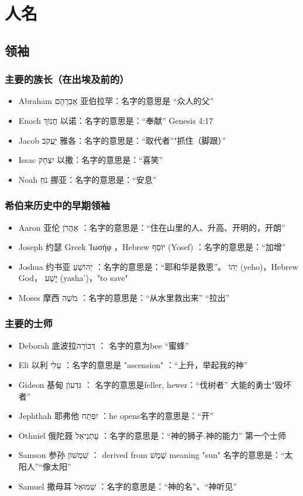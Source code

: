 \section{人名}
\subsection{领袖}
\subsubsection{主要的族长（在出埃及前的）}
\begin{itemize}
\itemsep-.45em  
\item Abraham אַבְרָהָם 亚伯拉罕：名字的意思是 “众人的父”
\item Enoch חֲנוֹךְ 以诺：名字的意思是：“奉献” Genesis 4:17
\item Jacob יַעֲקֹב 雅各：名字的意思是：“取代者”"抓住（脚跟）”
\item Issac יִצְחָק‎ 以撒：名字的意思是：“喜笑”
\item Noah נֹחַ 挪亚：名字的意思是：“安息”
\end{itemize}

\subsubsection{希伯来历史中的早期领袖}
\begin{itemize}
\itemsep-.45em
\item Aaron  亚伦 אַהֲרֹן ：名字的意思是：“住在山里的人、升高、开明的，开朗”
\item Joseph  约瑟 Greek Ἰωσήφ ，Hebrew  יוֹסֵף (Yosef) ：名字的意思是：“加增”
\item Joshua  约书亚 יְהוֹשֻׁעַ ：名字的意思是：“耶和华是救恩”。  יְהוֹ (yeho)，Hebrew God， יָשַׁע (yasha')，"to save"
\item Moses  摩西 מֹשֶׁה ：名字的意思是：“从水里救出来” “拉出”
\end{itemize}

\subsubsection{主要的士师}
\begin{itemize}
\itemsep-.45em
\item Deborah 底波拉דְּבוֹרָה ： 名字的意为bee “蜜蜂”
\item Eli 以利 עֵלִי ：名字的意思是 "ascension" ：“上升，举起我的神”
\item Gideon 基甸 גִּדְעוֹן ： 名字的意思是feller, hewer：“伐树者” 大能的勇士"毁坏者”
\item Jephthah 耶弗他  יִפְתַח ：he opens名字的意思是：“开”
\item Othniel 俄陀聂 עָתְנִיאֵל ：名字的意思是：“神的狮子.神的能力” 第一个士师
\item Samson 参孙 שִׁמְשׁוֹן ： derived from שֶׁמֶשׁ meaning "sun" 名字的意思是：“太阳人”“像太阳”
\item Samuel 撒母耳 שְׁמוּאֵל ：名字的意思是：“神的名”、“神听见”
\end{itemize}

